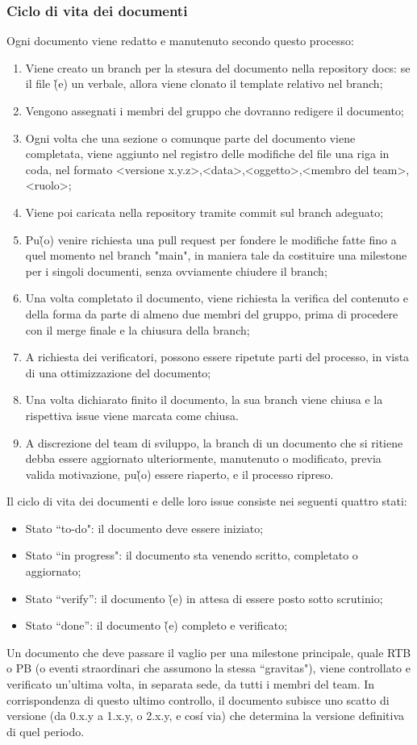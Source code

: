 \begin{itemize}
\subsubsection{Ciclo di vita dei documenti}
Ogni documento viene redatto e manutenuto secondo questo processo:
\begin{enumerate}
    \item Viene creato un branch per la stesura del documento nella repository docs: se il file \`(e) un verbale, allora viene clonato il template relativo nel branch;
    \item Vengono assegnati i membri del gruppo che dovranno redigere il documento; 
    \item Ogni volta che una sezione o comunque parte del documento viene completata, viene aggiunto nel registro delle modifiche del file una riga in coda, nel formato <versione x.y.z>,<data>,<oggetto>,<membro del team>,<ruolo>;  
    \item Viene poi caricata nella repository tramite commit sul branch adeguato;
    \item Pu\`(o) venire richiesta una pull request per fondere le modifiche fatte fino a quel momento nel branch "main", in maniera tale da costituire una milestone per i singoli documenti, senza ovviamente chiudere il branch;
    \item Una volta completato il documento, viene richiesta la verifica del contenuto e della forma da parte di almeno due membri del gruppo, prima di procedere con il merge finale e la chiusura della branch; 
    \item A richiesta dei verificatori, possono essere ripetute parti del processo, in vista di una ottimizzazione del documento;
    \item Una volta dichiarato finito il documento, la sua branch viene chiusa e la rispettiva issue viene marcata come chiusa.
    \item A discrezione del team di sviluppo, la branch di un documento che si ritiene debba essere aggiornato ulteriormente, manutenuto o modificato, previa valida motivazione, pu\`(o) essere riaperto, e il processo ripreso. 
\end{enumerate}
Il ciclo di vita dei documenti e delle loro issue consiste nei seguenti quattro stati:
\begin{itemize} 
    \item Stato ``to-do": il documento deve essere iniziato;
    \item Stato ``in progress": il documento sta venendo scritto, completato o aggiornato;
    \item Stato ``verify'': il documento \`(e) in attesa di essere posto sotto scrutinio;
    \item Stato ``done'': il documento \`(e) completo e verificato;
\end{itemize}
Un documento che deve passare il vaglio per una milestone principale, quale RTB o PB (o eventi straordinari che assumono la stessa ``gravitas"), viene controllato e verificato un'ultima volta, in separata sede, da tutti i membri del team.
In corrispondenza di questo ultimo controllo, il documento subisce uno scatto di versione (da 0.x.y a 1.x.y, o 2.x.y, e cosí via) che determina la versione definitiva di quel periodo.


\end{itemize}
